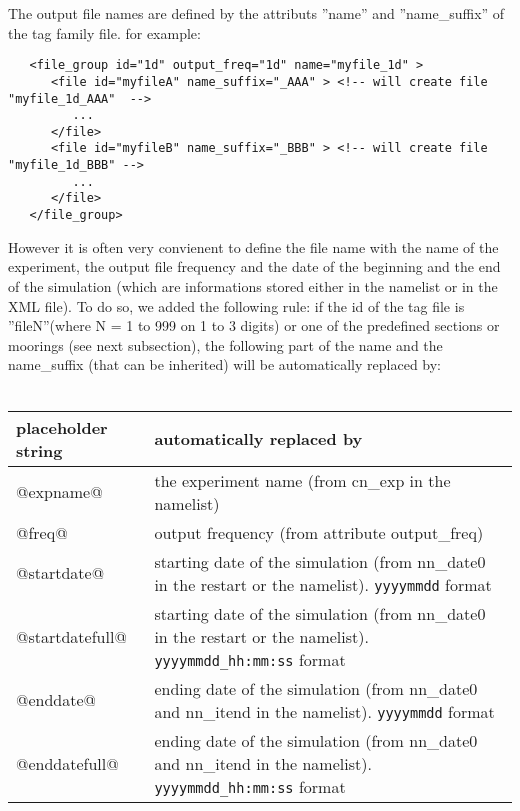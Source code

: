\documentclass[NEMO_book]{subfiles}
\begin{document}
The output file names are defined by the attributs ''name'' and ''name\_suffix'' of the tag family file. for example:
\vspace{-20pt}
\begin{alltt}  {{\scriptsize
\begin{verbatim}
   <file_group id="1d" output_freq="1d" name="myfile_1d" > 
      <file id="myfileA" name_suffix="_AAA" > <!-- will create file "myfile_1d_AAA"  -->
         ...
      </file>
      <file id="myfileB" name_suffix="_BBB" > <!-- will create file "myfile_1d_BBB" -->
         ...
      </file>
   </file_group>
\end{verbatim}
}}\end{alltt} 
However it is often very convienent to define the file name with the name of the experiment, the output file frequency and the date of the beginning and the end of the simulation (which are informations stored either in the namelist or in the XML file). To do so, we added the following rule: if the id of the tag file is ''fileN''(where N = 1 to 999 on 1 to 3 digits) or one of the predefined sections or moorings (see next subsection), the following part of the name and the name\_suffix (that can be inherited) will be automatically replaced by:\\
\\
\begin{tabular}{|p{4cm}|p{8cm}|}
   \hline
   \centering placeholder string & automatically  replaced by \\
   \hline
   \hline
   \centering @expname@ &
   the experiment name (from cn\_exp in the namelist) \\
   \hline
   \centering @freq@ &
   output frequency (from attribute output\_freq) \\
   \hline
   \centering @startdate@  &
   starting date of the simulation (from nn\_date0 in the restart or the namelist). \verb?yyyymmdd? format \\
   \hline
   \centering @startdatefull@  & 
   starting date of the simulation (from nn\_date0 in the restart or the namelist). \verb?yyyymmdd_hh:mm:ss? format \\
   \hline
   \centering @enddate@  &
   ending date of the simulation (from nn\_date0 and nn\_itend in the namelist). \verb?yyyymmdd? format \\
   \hline
   \centering @enddatefull@  & 
   ending date of the simulation (from nn\_date0 and nn\_itend in the namelist). \verb?yyyymmdd_hh:mm:ss? format \\
   \hline
\end{tabular}\\
\\
\end{document}
